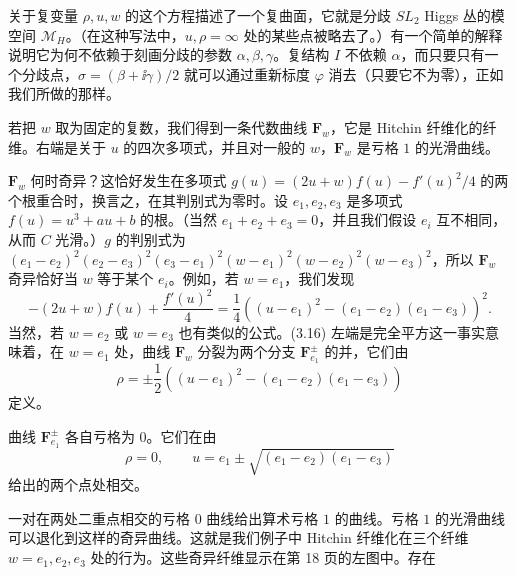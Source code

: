 关于复变量 $\rho,u,w$ 的这个方程描述了一个复曲面，它就是分歧 $SL_2$ Higgs 丛的模空间 $\mathcal{M}_H$。（在这种写法中，$u,\rho=\infty$ 处的某些点被略去了。）有一个简单的解释说明它为何不依赖于刻画分歧的参数 $\alpha,\beta,\gamma$。复结构 $I$ 不依赖 $\alpha$，而只要只有一个分歧点，$\sigma=(\beta+\ii\gamma)/2$ 就可以通过重新标度 $\varphi$ 消去（只要它不为零），正如我们所做的那样。

若把 $w$ 取为固定的复数，我们得到一条代数曲线 $\boldsymbol{F}_w$，它是 Hitchin 纤维化的纤维。右端是关于 $u$ 的四次多项式，并且对一般的 $w$，$\boldsymbol{F}_w$ 是亏格 $1$ 的光滑曲线。

$\boldsymbol{F}_w$ 何时奇异？这恰好发生在多项式 $g(u)=(2u+w)f(u)-f'(u)^2/4$ 的两个根重合时，换言之，在其判别式为零时。设 $e_1,e_2,e_3$ 是多项式 $f(u)=u^3+au+b$ 的根。（当然 $e_1+e_2+e_3=0$，并且我们假设 $e_i$ 互不相同，从而 $C$ 光滑。）$g$ 的判别式为 $(e_1-e_2)^2(e_2-e_3)^2(e_3-e_1)^2(w-e_1)^2(w-e_2)^2(w-e_3)^2$，所以 $\boldsymbol{F}_w$ 奇异恰好当 $w$ 等于某个 $e_i$。例如，若 $w=e_1$，我们发现
\begin{equation}\tag{3.16}
-(2u+w)f(u)+\frac{f'(u)^2}{4}=\frac{1}{4}\left((u-e_1)^2-(e_1-e_2)(e_1-e_3)\right)^2.
\end{equation}
当然，若 $w=e_2$ 或 $w=e_3$ 也有类似的公式。(3.16) 左端是完全平方这一事实意味着，在 $w=e_1$ 处，曲线 $\boldsymbol{F}_w$ 分裂为两个分支 $\boldsymbol{F}_{e_1}^{\pm}$ 的并，它们由
\begin{equation}\tag{3.17}
\rho=\pm\frac{1}{2}\left((u-e_1)^2-(e_1-e_2)(e_1-e_3)\right)
\end{equation}
定义。

曲线 $\boldsymbol{F}_{e_1}^{\pm}$ 各自亏格为 $0$。它们在由
\begin{equation}\tag{3.18}
\rho=0,\qquad u=e_1\pm\sqrt{(e_1-e_2)(e_1-e_3)}
\end{equation}
给出的两个点处相交。

一对在两处二重点相交的亏格 $0$ 曲线给出算术亏格 $1$ 的曲线。亏格 $1$ 的光滑曲线可以退化到这样的奇异曲线。这就是我们例子中 Hitchin 纤维化在三个纤维 $w=e_1,e_2,e_3$ 处的行为。这些奇异纤维显示在第 18 页的左图中。存在

